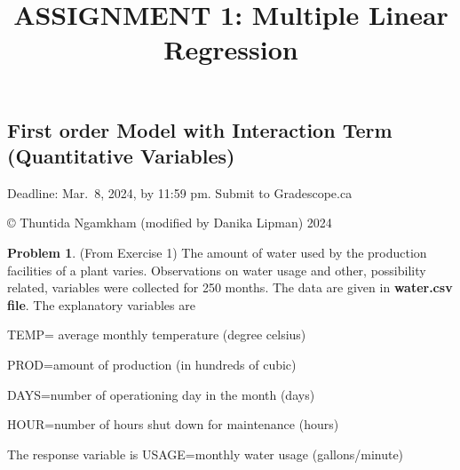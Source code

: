 \documentclass[
]{article}
\title{ASSIGNMENT 1: Multiple Linear Regression}
\author{}
\date{\vspace{-2.5em}}
\begin{document}
\maketitle

\hypertarget{first-order-model-with-interaction-term-quantitative-variables}{%
\subsection{First order Model with Interaction Term (Quantitative
Variables)}\label{first-order-model-with-interaction-term-quantitative-variables}}

Deadline: Mar.~8, 2024, by 11:59 pm. Submit to Gradescope.ca

© Thuntida Ngamkham (modified by Danika Lipman) 2024

\textbf{Problem 1}. (From Exercise 1) The amount of water used by the
production facilities of a plant varies. Observations on water usage and
other, possibility related, variables were collected for 250 months. The
data are given in \textbf{water.csv file}. The explanatory variables are

TEMP= average monthly temperature (degree celsius)

PROD=amount of production (in hundreds of cubic)

DAYS=number of operationing day in the month (days)

HOUR=number of hours shut down for maintenance (hours)

The response variable is USAGE=monthly water usage (gallons/minute)
\end{document}
